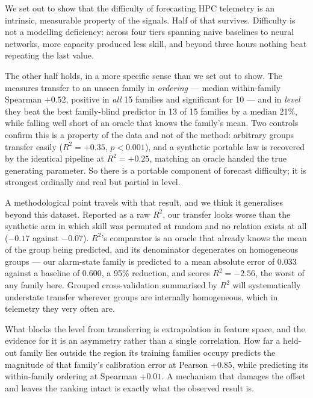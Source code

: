 \documentclass[11pt,a4paper]{article}
\newcommand{\num}[1]{#1}
\begin{document}
We set out to show that the difficulty of forecasting HPC telemetry is an
intrinsic, measurable property of the signals. Half of that survives. Difficulty
is not a modelling deficiency: across four tiers spanning naive baselines to
neural networks, more capacity produced less skill, and beyond three hours
nothing beat repeating the last value.

The other half holds, in a more specific sense than we set out to show. The
measures transfer to an unseen family in \emph{ordering} --- median
within-family Spearman \(+0.52\), positive in \emph{all} \num{15} families
and significant for \num{10} --- and in \emph{level} they beat the best
family-blind predictor in \num{13} of \num{15} families by a median \num{21}\%,
while falling well short of an oracle that knows the family's mean. Two controls
confirm this is a property of the data and not of the method: arbitrary groups
transfer easily (\(R^2 = +0.35\), \(p<0.001\)), and a synthetic portable law is
recovered by the identical pipeline at \(R^2 = +0.25\), matching an oracle
handed the true generating parameter. So there is a portable component of
forecast difficulty; it is strongest ordinally and real but partial in level.

A methodological point travels with that result, and we think it generalises
beyond this dataset. Reported as a raw \(R^2\), our transfer looks worse than
the synthetic arm in which skill was permuted at random and no relation exists
at all (\(-0.17\) against \(-0.07\)). \(R^2\)'s comparator is an oracle that
already knows the mean of the group being predicted, and its denominator
degenerates on homogeneous groups --- our alarm-state family is predicted to a
mean absolute error of \num{0.033} against a baseline of \num{0.600}, a
\num{95}\% reduction, and scores \(R^2=-2.56\), the worst of any family here. Grouped cross-validation summarised by \(R^2\) will
systematically understate transfer wherever groups are internally homogeneous,
which in telemetry they very often are.

What blocks the level from transferring is extrapolation in feature space, and
the evidence for it is an asymmetry rather than a single correlation. How far a
held-out family lies outside the region its training families occupy predicts
the magnitude of that family's calibration error at Pearson \(+0.85\), while
predicting its within-family ordering at Spearman \(+0.01\). A mechanism that
damages the offset and leaves the ranking intact is exactly what the observed
result is.
\end{document}

